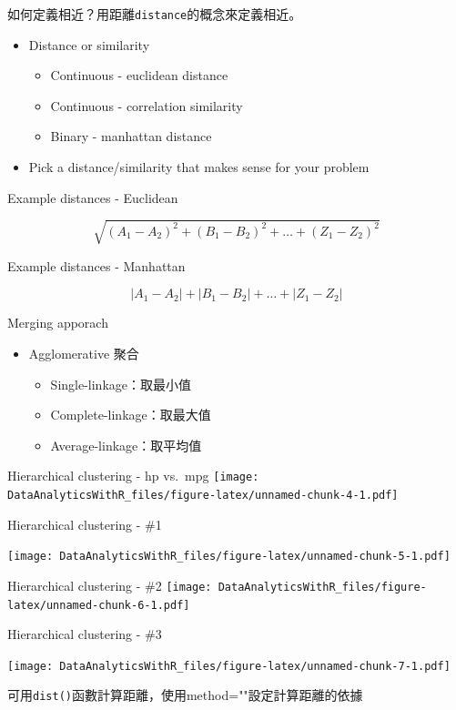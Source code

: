 \documentclass[
]{book}
\providecommand{\tightlist}{%
  \setlength{\itemsep}{0pt}\setlength{\parskip}{0pt}}
\begin{document}
如何定義相近？用距離\texttt{distance}的概念來定義相近。

\begin{itemize}
\tightlist
\item
  Distance or similarity

  \begin{itemize}
  \tightlist
  \item
    Continuous - euclidean distance
  \item
    Continuous - correlation similarity
  \item
    Binary - manhattan distance
  \end{itemize}
\item
  Pick a distance/similarity that makes sense for your problem
\end{itemize}

Example distances - Euclidean

\[\sqrt{(A_1-A_2)^2 + (B_1-B_2)^2 + \ldots + (Z_1-Z_2)^2}\]

Example distances - Manhattan

\[|A_1-A_2| + |B_1-B_2| + \ldots + |Z_1-Z_2|\]

Merging apporach

\begin{itemize}
\item
  Agglomerative 聚合

  \begin{itemize}
  \tightlist
  \item
    Single-linkage：取最小值
  \item
    Complete-linkage：取最大值
  \item
    Average-linkage：取平均值
  \end{itemize}
\end{itemize}

Hierarchical clustering - hp vs.~mpg
\texttt{[image: DataAnalyticsWithR\_files/figure-latex/unnamed-chunk-4-1.pdf]}

Hierarchical clustering - \#1

\texttt{[image: DataAnalyticsWithR\_files/figure-latex/unnamed-chunk-5-1.pdf]}

Hierarchical clustering - \#2
\texttt{[image: DataAnalyticsWithR\_files/figure-latex/unnamed-chunk-6-1.pdf]}

Hierarchical clustering - \#3

\texttt{[image: DataAnalyticsWithR\_files/figure-latex/unnamed-chunk-7-1.pdf]}

可用\texttt{dist()}函數計算距離，使用method=""設定計算距離的依據
\end{document}
